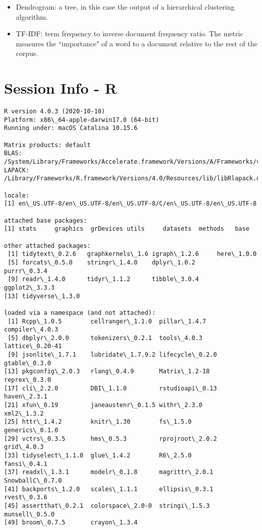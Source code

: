 \begin{appendices}
\begin{itemize}
\item{Dendrogram: a tree, in this case the output of a hierarchical clustering algorithm.}

\item{TF-IDF: term frequency to inverse document frequency ratio. The metric measures the ``importance" of a word to a document relative to the rest of the corpus.}


\end{itemize}


\chapter{Session Info - R}
\begin{lstlisting}
R version 4.0.3 (2020-10-10)
Platform: x86\_64-apple-darwin17.0 (64-bit)
Running under: macOS Catalina 10.15.6

Matrix products: default
BLAS:   /System/Library/Frameworks/Accelerate.framework/Versions/A/Frameworks/vecLib.framework/Versions/A/libBLAS.dylib
LAPACK: /Library/Frameworks/R.framework/Versions/4.0/Resources/lib/libRlapack.dylib

locale:
[1] en\_US.UTF-8/en\_US.UTF-8/en\_US.UTF-8/C/en\_US.UTF-8/en\_US.UTF-8

attached base packages:
[1] stats     graphics  grDevices utils     datasets  methods   base     

other attached packages:
 [1] tidytext\_0.2.6   graphkernels\_1.6 igraph\_1.2.6     here\_1.0.0      
 [5] forcats\_0.5.0    stringr\_1.4.0    dplyr\_1.0.2      purrr\_0.3.4     
 [9] readr\_1.4.0      tidyr\_1.1.2      tibble\_3.0.4     ggplot2\_3.3.3   
[13] tidyverse\_1.3.0 

loaded via a namespace (and not attached):
 [1] Rcpp\_1.0.5        cellranger\_1.1.0  pillar\_1.4.7      compiler\_4.0.3   
 [5] dbplyr\_2.0.0      tokenizers\_0.2.1  tools\_4.0.3       lattice\_0.20-41  
 [9] jsonlite\_1.7.1    lubridate\_1.7.9.2 lifecycle\_0.2.0   gtable\_0.3.0     
[13] pkgconfig\_2.0.3   rlang\_0.4.9       Matrix\_1.2-18     reprex\_0.3.0     
[17] cli\_2.2.0         DBI\_1.1.0         rstudioapi\_0.13   haven\_2.3.1      
[21] xfun\_0.19         janeaustenr\_0.1.5 withr\_2.3.0       xml2\_1.3.2       
[25] httr\_1.4.2        knitr\_1.30        fs\_1.5.0          generics\_0.1.0   
[29] vctrs\_0.3.5       hms\_0.5.3         rprojroot\_2.0.2   grid\_4.0.3       
[33] tidyselect\_1.1.0  glue\_1.4.2        R6\_2.5.0          fansi\_0.4.1      
[37] readxl\_1.3.1      modelr\_0.1.8      magrittr\_2.0.1    SnowballC\_0.7.0  
[41] backports\_1.2.0   scales\_1.1.1      ellipsis\_0.3.1    rvest\_0.3.6      
[45] assertthat\_0.2.1  colorspace\_2.0-0  stringi\_1.5.3     munsell\_0.5.0    
[49] broom\_0.7.5       crayon\_1.3.4


\end{lstlisting}
\end{appendices}
